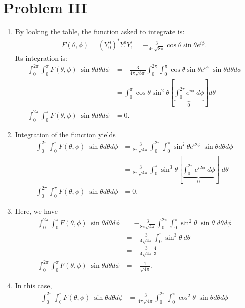 \documentclass[letterpaper,11pt,twoside]{article}
\begin{document}
\section*{Problem III}
\begin{enumerate}[itemsep=0pt,topsep=0pt,label=\alph*)]
  \item By looking the table, the function asked to integrate is:
  \begin{align*}
    F(\theta,\phi)=(Y_0^0)^*Y_1^0Y_1^1=-\frac{3}{4\pi\sqrt{8\pi}}\cos\theta\sin\theta e^{i\phi}.
  \end{align*}
  Its integration is:
  \begin{align*}
    \int_0^{2\pi}\int_0^\pi F(\theta,\phi)\;\sin\theta d\theta d\phi&=-\frac{3}{4\pi\sqrt{8\pi}}\int_0^{2\pi}\int_0^\pi\cos\theta\sin\theta e^{i\phi}\;\sin\theta d\theta d\phi\\
    &=\int_0^{\pi}\cos\theta\sin^2\theta\left[\underbrace{\int_0^{2\pi} e^{i\phi}\;d\phi}_{0}\right]d\theta\\
    \int_0^{2\pi}\int_0^\pi F(\theta,\phi)\;\sin\theta d\theta d\phi&=0.
  \end{align*}
  \item Integration of the function yields
  \begin{align*}
    \int_0^{2\pi}\int_0^\pi F(\theta,\phi)\;\sin\theta d\theta d\phi&=\frac{3}{8\pi\sqrt{4\pi}}\int_0^{2\pi}\int_0^\pi \sin^2\theta e^{i2\phi}\;\sin\theta d\theta d\phi\\
    &=\frac{3}{8\pi\sqrt{4\pi}}\int_0^\pi\sin^3\theta\left[\underbrace{\int_0^{2\pi}e^{i2\phi}\;d\phi}_{0}\right]\;d\theta\\
    \int_0^{2\pi}\int_0^\pi F(\theta,\phi)\;\sin\theta d\theta d\phi&=0.
  \end{align*}
  \item Here, we have 
  \begin{align*}
    \int_0^{2\pi}\int_0^\pi F(\theta,\phi)\;\sin\theta d\theta d\phi&=-\frac{3}{8\pi\sqrt{4\pi}}\int_0^{2\pi}\int_0^\pi\sin^2\theta\;\sin\theta\;d\theta d\phi\\
    &=-\frac{3}{4\sqrt{4\pi}}\int_0^{\pi}\sin^3\theta\;d\theta\\
    &=-\frac{3}{4\sqrt{4\pi}}\frac{4}{3}\\
    \int_0^{2\pi}\int_0^\pi F(\theta,\phi)\;\sin\theta d\theta d\phi&=-\frac{1}{\sqrt{4\pi}}.
  \end{align*}
  \item In this case, 
  \begin{align*}
    \int_0^{2\pi}\int_0^\pi F(\theta,\phi)\;\sin\theta d\theta d\phi&=\frac{3}{4\pi\sqrt{4\pi}}\int_0^{2\pi}\int_0^\pi \cos^2\theta\;\sin\theta d\theta d\phi\\

\end{align*}
\end{enumerate}
\end{document}
